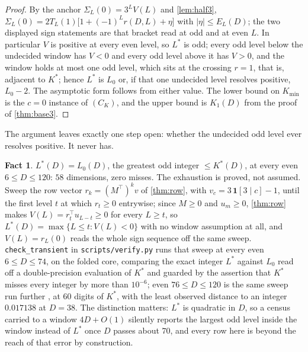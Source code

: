\documentclass[11pt]{amsart}
\theoremstyle{definition}
\newtheorem{fact}[theorem]{Fact}
\theoremstyle{remark}
\begin{document}
\begin{proof}
By the anchor $\Sigma_L(0) = 3^L V(L)$ and \cref{lem:half3}, $\Sigma_L(0) = 2T_L(1)\bigl[1 + (-1)^L r(D,L) + \eta\bigr]$ with $\lvert\eta\rvert \le E_L(D)$; the two displayed sign statements are that bracket read at odd and at even $L$. In particular $V$ is positive at every even level, so $L^{*}$ is odd; every odd level below the undecided window has $V < 0$ and every odd level above it has $V > 0$, and the window holds at most one odd level, which sits at the crossing $r = 1$, that is, adjacent to $K^{*}$; hence $L^{*}$ is $L_0$ or, if that one undecided level resolves positive, $L_0 - 2$. The asymptotic form follows from either value. The lower bound on $K_{\min}$ is the $c = 0$ instance of $(C_K)$, and the upper bound is $K_1(D)$ from the proof of \cref{thm:base3}.
\end{proof}

The argument leaves exactly one step open: whether the undecided odd level ever resolves positive. It never has.

\begin{fact}
\label{fact:lstar}
$L^{*}(D) = L_0(D)$, the greatest odd integer $\le K^{*}(D)$, at every even $6 \le D \le 120$: $58$ dimensions, zero misses. The exhaustion is proved, not assumed. Sweep the row vector $r_k = (M^{\top})^k v$ of \cref{thm:row}, with $v_c = 3\,\mathbf 1[3 \mid c] - 1$, until the first level $t$ at which $r_t \ge 0$ entrywise; since $M \ge 0$ and $u_m \ge 0$, \cref{thm:row} makes $V(L) = r_t^{\top}u_{L-t} \ge 0$ for every $L \ge t$, so $L^{*}(D) = \max\{L \le t : V(L) < 0\}$ with no window assumption at all, and $V(L) = r_L(0)$ reads the whole sign sequence off the same sweep. \texttt{check\_transient} in \texttt{scripts/verify.py} runs that sweep at every even $6 \le D \le 74$, on the folded core, comparing the exact integer $L^{*}$ against $L_0$ read off a double-precision evaluation of $K^{*}$ and guarded by the assertion that $K^{*}$ misses every integer by more than $10^{-6}$; even $76 \le D \le 120$ is the same sweep run further \cite{lab-transient}, at $60$ digits of $K^{*}$, with the least observed distance to an integer $0.017138$ at $D = 38$. The distinction matters: $L^{*}$ is quadratic in $D$, so a census carried to a window $4D + O(1)$ silently reports the largest odd level inside the window instead of $L^{*}$ once $D$ passes about $70$, and every row here is beyond the reach of that error by construction.
\end{fact}
\end{document}
